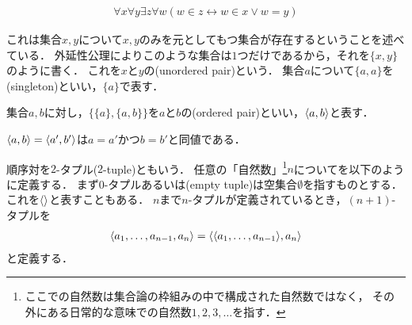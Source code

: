 \documentclass[../main.tex]{subfiles}
\begin{document}

\begin{thmbox}
\begin{axiom}
\begin{align}
    \forall x \forall y \exists z \forall w (w \in z \leftrightarrow w \in x \lor w = y)
\end{align}
\end{axiom}
\end{thmbox}

これは集合\(x, y\)について\(x, y\)のみを元としてもつ集合が存在するということを述べている．
外延性公理によりこのような集合は\(1\)つだけであるから，それを\(\{x, y\}\)のように書く．
これを\(x\)と\(y\)の(unordered pair)という．
集合\(a\)について\(\{a, a\}\)を(singleton)といい，\(\{a\}\)で表す．

\begin{thmbox}
\begin{definition}
集合\(a, b\)に対し，\(\{\{a\}, \{a, b\}\}\)を\(a\)と\(b\)の(ordered pair)といい，\(\langle a, b \rangle\)と表す．
\end{definition}
\end{thmbox}

\begin{proposition} \(\langle a, b \rangle = \langle a', b' \rangle\)は\(a = a'\)かつ\(b = b'\)と同値である．
\end{proposition}

順序対を\(2\)-タプル(\(2\)-tuple)ともいう．
任意の「自然数」\footnote{%
ここでの自然数は集合論の枠組みの中で構成された自然数ではなく，
その外にある日常的な意味での自然数\(1, 2, 3, \ldots\)を指す．
}\(n\)についてを以下のように定義する．
まず\(0\)-タプルあるいは(empty tuple)は空集合\(\emptyset\)を指すものとする．
これを\(\langle  \rangle\)と表すこともある．
\(n\)まで\(n\)-タプルが定義されているとき，\((n + 1)\)-タプルを
\begin{align*}
    \langle a_1, \ldots, a_{n - 1}, a_n \rangle = \langle \langle a_1, \ldots, a_{n -1} \rangle, a_n \rangle
\end{align*}
と定義する．
\end{document}
